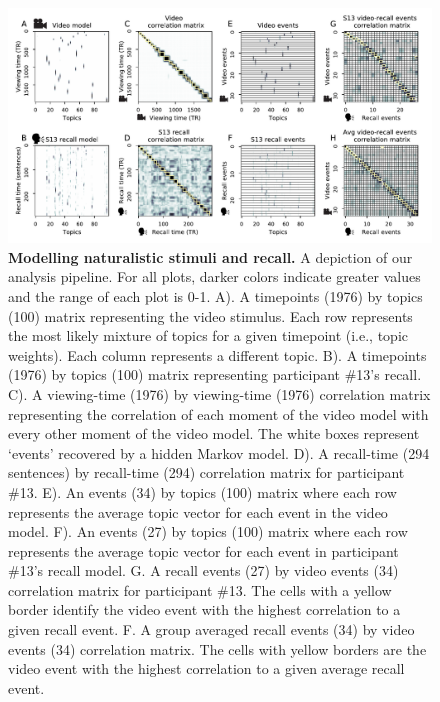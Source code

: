 \documentclass{article}
\begin{document}
\begin{figure}[t!]
\centering
\includegraphics[width=\textwidth]{figs/2_eventseg.pdf}
\caption{\small \textbf{Modelling naturalistic stimuli and recall.} A depiction of our analysis pipeline. For all plots, darker colors indicate greater values and the range of each plot is 0-1.  A). A timepoints (1976) by topics (100) matrix representing the video stimulus.  Each row represents the most likely mixture of topics for a given timepoint (i.e., topic weights). Each column represents a different topic. B). A timepoints (1976) by topics (100) matrix representing participant \#13's recall. C). A viewing-time (1976) by viewing-time (1976) correlation matrix representing the correlation of each moment of the video model with every other moment of the video model. The white boxes represent `events' recovered by a hidden Markov model. D). A recall-time (294 sentences) by recall-time (294) correlation matrix for participant \#13. E). An events (34) by topics (100) matrix where each row represents the average topic vector for each event in the video model.  F). An events (27) by topics (100) matrix where each row represents the average topic vector for each event in participant \#13's recall model. G. A recall events (27) by video events (34) correlation matrix for participant \#13. The cells with a yellow border identify the video event with the highest correlation to a given recall event. F. A group averaged recall events (34) by video events (34) correlation matrix.  The cells with yellow borders are the video event with the highest correlation to a given average recall event.}
\label{fig:model}
\end{figure}
\end{document}
